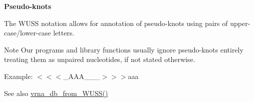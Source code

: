 \begin{DoxyItemize}
\item {\bfseries Pseudo-\/knots}

The W\+U\+SS notation allows for annotation of pseudo-\/knots using pairs of upper-\/case/lower-\/case letters. \begin{DoxyNote}{Note}
Our programs and library functions usually ignore pseudo-\/knots entirely treating them as unpaired nucleotides, if not stated otherwise.
\end{DoxyNote}
Example\+: {\ttfamily $<$$<$$<$\+\_\+\+A\+A\+A\+\_\+\+\_\+\+\_\+$>$$>$$>$aaa} 
\end{DoxyItemize}

\begin{DoxySeeAlso}{See also}
\hyperlink{group__struct__utils_ga02ca70cffb2d864f7b2d95d92218bae0}{vrna\+\_\+db\+\_\+from\+\_\+\+W\+U\+S\+S()} 
\end{DoxySeeAlso}
